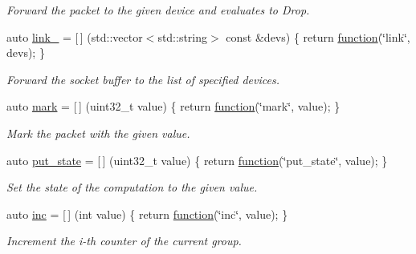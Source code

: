 \begin{DoxyCompactItemize}
\begin{DoxyCompactList}\small\item\em Forward the packet to the given device and evaluates to {\ttfamily Drop}. \end{DoxyCompactList}\item 
auto \hyperlink{namespacepfq_1_1lang_1_1anonymous__namespace_02default_8hpp_03_aaad98f847b8e4c53a5ddec3c93b05296}{link\+\_\+} = \mbox{[}$\,$\mbox{]} (std\+::vector$<$std\+::string$>$ const \&devs) \{ return \hyperlink{namespacepfq_1_1lang_a1a4638059d700ae08d0ca63886ff2bb3}{function}(\char`\"{}link\char`\"{}, devs); \}
\begin{DoxyCompactList}\small\item\em Forward the socket buffer to the list of specified devices. \end{DoxyCompactList}\item 
auto \hyperlink{namespacepfq_1_1lang_1_1anonymous__namespace_02default_8hpp_03_a7b831baeabda070b89ca862a9445a4a8}{mark} = \mbox{[}$\,$\mbox{]} (uint32\+\_\+t value) \{ return \hyperlink{namespacepfq_1_1lang_a1a4638059d700ae08d0ca63886ff2bb3}{function}(\char`\"{}mark\char`\"{}, value); \}
\begin{DoxyCompactList}\small\item\em Mark the packet with the given value. \end{DoxyCompactList}\item 
auto \hyperlink{namespacepfq_1_1lang_1_1anonymous__namespace_02default_8hpp_03_afd94f51db878b2f70225c944c3f1d300}{put\+\_\+state} = \mbox{[}$\,$\mbox{]} (uint32\+\_\+t value) \{ return \hyperlink{namespacepfq_1_1lang_a1a4638059d700ae08d0ca63886ff2bb3}{function}(\char`\"{}put\+\_\+state\char`\"{}, value); \}
\begin{DoxyCompactList}\small\item\em Set the state of the computation to the given value. \end{DoxyCompactList}\item 
auto \hyperlink{namespacepfq_1_1lang_1_1anonymous__namespace_02default_8hpp_03_acc7d3a4cca5eb30ff5456e19c613b174}{inc} = \mbox{[}$\,$\mbox{]} (int value) \{ return \hyperlink{namespacepfq_1_1lang_a1a4638059d700ae08d0ca63886ff2bb3}{function}(\char`\"{}inc\char`\"{}, value); \}
\begin{DoxyCompactList}\small\item\em Increment the i-\/th counter of the current group. \end{DoxyCompactList}\item 

\end{DoxyCompactItemize}
